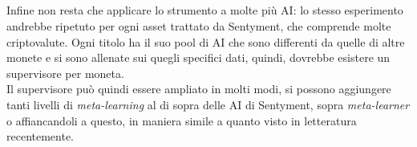 \documentclass[a4paper,12pt]{report}
\begin{document}
\begin{fig}
\\~\\\\~\\ Infine non resta che applicare lo strumento a molte più AI: lo stesso esperimento andrebbe ripetuto per ogni asset trattato da Sentyment, che comprende molte criptovalute. Ogni titolo ha il suo pool di AI che sono differenti da quelle di altre monete e si sono allenate sui quegli specifici dati, quindi, dovrebbe esistere un supervisore per moneta.\\ Il supervisore può quindi essere ampliato in molti modi, si possono aggiungere tanti livelli di \textit{meta-learning} al di sopra delle AI di Sentyment, sopra \textit{meta-learner} o affiancandoli a questo, in maniera simile a quanto visto in letteratura recentemente.

\newpage


\end{fig}
\end{document}

